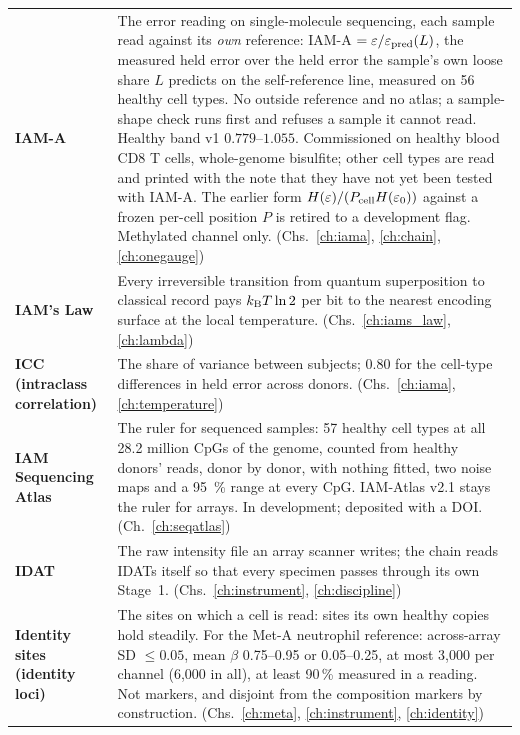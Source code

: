 {\begin{longtable}{@{}>{\raggedright\arraybackslash}p{}>{\raggedright\arraybackslash}p{}@{}}
\textbf{IAM-A} & The error reading on single-molecule sequencing, each sample read against its \emph{own} reference: IAM-A $=\varepsilon/\varepsilon_{\rm pred}(L)$, the measured held error over the held error the sample's own loose share $L$ predicts on the self-reference line, measured on 56 healthy cell types. No outside reference and no atlas; a sample-shape check runs first and refuses a sample it cannot read. Healthy band v1 $0.779$--$1.055$. Commissioned on healthy blood CD8 T cells, whole-genome bisulfite; other cell types are read and printed with the note that they have not yet been tested with IAM-A. The earlier form $H(\varepsilon)/(P_{\rm cell}H(\varepsilon_0))$ against a frozen per-cell position $P$ is retired to a development flag. Methylated channel only. {\footnotesize(Chs.~\ref{ch:iama}, \ref{ch:chain}, \ref{ch:onegauge})}\\[1pt]
\textbf{IAM's Law} & Every irreversible transition from quantum superposition to classical record pays $k_{\mathrm B} T\ln2$ per bit to the nearest encoding surface at the local temperature. {\footnotesize(Chs.~\ref{ch:iams_law}, \ref{ch:lambda})}\\[1pt]
\textbf{ICC (intraclass correlation)} & The share of variance between subjects; 0.80 for the cell-type differences in held error across donors. {\footnotesize(Chs.~\ref{ch:iama}, \ref{ch:temperature})}\\[1pt]
\textbf{IAM Sequencing Atlas} & The ruler for sequenced samples: 57 healthy cell types at all 28.2 million CpGs of the genome, counted from healthy donors' reads, donor by donor, with nothing fitted, two noise maps and a 95~\% range at every CpG. IAM-Atlas v2.1 stays the ruler for arrays. In development; deposited with a DOI. {\footnotesize(Ch.~\ref{ch:seqatlas})}\\[1pt]
\textbf{IDAT} & The raw intensity file an array scanner writes; the chain reads IDATs itself so that every specimen passes through its own Stage~1. {\footnotesize(Chs.~\ref{ch:instrument}, \ref{ch:discipline})}\\[1pt]
\textbf{Identity sites (identity loci)} & The sites on which a cell is read: sites its own healthy copies hold steadily. For the Met-A neutrophil reference: across-array SD $\le0.05$, mean $\beta$ 0.75--0.95 or 0.05--0.25, at most 3,000 per channel (6,000 in all), at least 90\,\% measured in a reading. Not markers, and disjoint from the composition markers by construction. {\footnotesize(Chs.~\ref{ch:meta}, \ref{ch:instrument}, \ref{ch:identity})}\\[1pt]

\end{longtable}}
